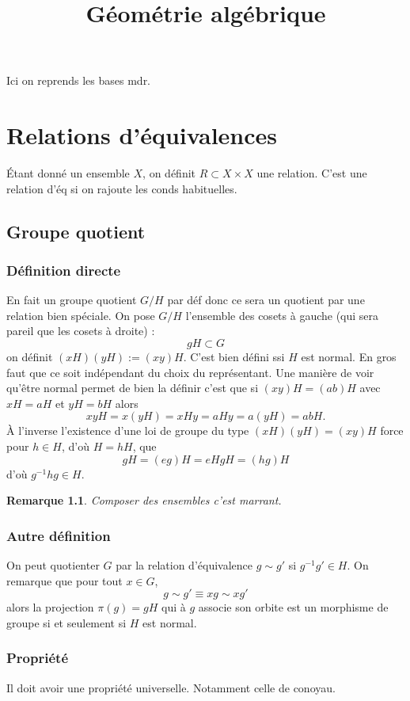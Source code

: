 \documentclass[a4paper,12pt]{book}
\title{Géométrie algébrique}
\date{}
\theoremstyle{plain}
\newtheorem{rem}{Remarque}
\theoremstyle{definition}
\theoremstyle{remark}
\begin{document}
\maketitle
\tableofcontents

Ici on reprends les bases mdr.

\chapter{Relations d'équivalences}
Étant donné un ensemble $X$, on définit
$R\subset X\times X$ une relation. C'est
une relation d'éq si on rajoute les conds
habituelles. 

\section{Groupe quotient}
\subsection{Définition directe}
En fait un groupe quotient $G/H$ par déf donc
ce sera un quotient par une relation bien 
spéciale. On pose $G/H$ l'ensemble des
cosets à gauche (qui sera pareil que les
cosets à droite) :
\[gH\subset G\]
on définit $(xH)(yH):=(xy)H$. C'est bien
défini ssi $H$ est normal. En gros
faut que ce soit indépendant du choix
du représentant. Une manière de voir 
qu'être normal permet de bien la définir
c'est que si $(xy)H=(ab)H$ avec $xH=aH$ 
et $yH=bH$ alors
\[xyH=x(yH)=xHy=aHy=a(yH)=abH.\]
À l'inverse l'existence d'une loi de 
groupe du type $(xH)(yH)=(xy)H$ force
pour $h\in H$, d'où $H=hH$, que
\[gH=(eg)H=eHgH=(hg)H\]
d'où $g^{-1}hg\in H$.

\begin{rem}
  Composer des ensembles c'est marrant.
\end{rem}

\subsection{Autre définition}
On peut quotienter $G$ par la relation
d'équivalence $g\sim g'$ si $g^{-1}g'\in H$.
On remarque que pour tout $x\in G$,
\[g\sim g' \equiv xg\sim xg'\]
alors la projection $\pi(g)=gH$ qui
à $g$ associe son orbite est
un morphisme de groupe si et seulement
si $H$ est normal.

\subsection{Propriété}
 Il doit avoir une propriété universelle.
 Notamment celle de conoyau.
\end{document}
